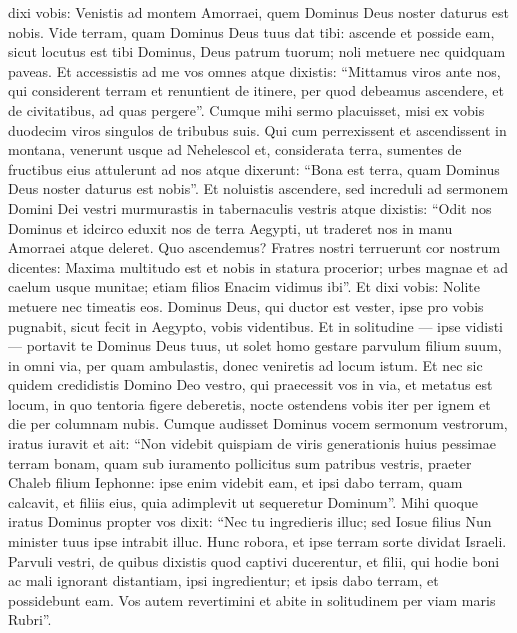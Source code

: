 \begin{biblechapter}
\verse dixi vobis: Venistis ad montem Amorraei, quem Dominus Deus noster daturus est nobis. 
\verse Vide terram, quam Dominus Deus tuus dat tibi: ascende et posside eam, sicut locutus est tibi Dominus, Deus patrum tuorum; noli metuere nec quidquam paveas.
 \verse Et accessistis ad me vos omnes atque dixistis: “Mittamus viros ante nos, qui considerent terram et renuntient de itinere, per quod debeamus ascendere, et de civitatibus, ad quas pergere”. 
\verse Cumque mihi sermo placuisset, misi ex vobis duodecim viros singulos de tribubus suis. 
\verse Qui cum perrexissent et ascendissent in montana, venerunt usque ad Nehelescol et, considerata terra, 
 \verse sumentes de fructibus eius attulerunt ad nos atque dixerunt: “Bona est terra, quam Dominus Deus noster daturus est nobis”. 
\verse Et noluistis ascendere, sed increduli ad sermonem Domini Dei vestri 
\verse murmurastis in tabernaculis vestris atque dixistis: “Odit nos Dominus et idcirco eduxit nos de terra Aegypti, ut traderet nos in manu Amorraei atque deleret. 
\verse Quo ascendemus? Fratres nostri terruerunt cor nostrum dicentes: Maxima multitudo est et nobis in statura procerior; urbes magnae et ad caelum usque munitae; etiam filios Enacim vidimus ibi”.
 \verse Et dixi vobis: Nolite metuere nec timeatis eos. 
\verse Dominus Deus, qui ductor est vester, ipse pro vobis pugnabit, sicut fecit in Aegypto, vobis videntibus. 
\verse Et in solitudine — ipse vidisti — portavit te Dominus Deus tuus, ut solet homo gestare parvulum filium suum, in omni via, per quam ambulastis, donec veniretis ad locum istum. 
\verse Et nec sic quidem credidistis Domino Deo vestro, 
\verse qui praecessit vos in via, et metatus est locum, in quo tentoria figere deberetis, nocte ostendens vobis iter per ignem et die per columnam nubis.
 \verse Cumque audisset Dominus vocem sermonum vestrorum, iratus iuravit et ait: 
 \verse “Non videbit quispiam de viris generationis huius pessimae terram bonam, quam sub iuramento pollicitus sum patribus vestris, 
\verse praeter Chaleb filium Iephonne: ipse enim videbit eam, et ipsi dabo terram, quam calcavit, et filiis eius, quia adimplevit ut sequeretur Dominum”. 
\verse Mihi quoque iratus Dominus propter vos dixit: “Nec tu ingredieris illuc; 
\verse sed Iosue filius Nun minister tuus ipse intrabit illuc. Hunc robora, et ipse terram sorte dividat Israeli. 
\verse Parvuli vestri, de quibus dixistis quod captivi ducerentur, et filii, qui hodie boni ac mali ignorant distantiam, ipsi ingredientur; et ipsis dabo terram, et possidebunt eam. 
\verse Vos autem revertimini et abite in solitudinem per viam maris Rubri”.

\end{biblechapter}
